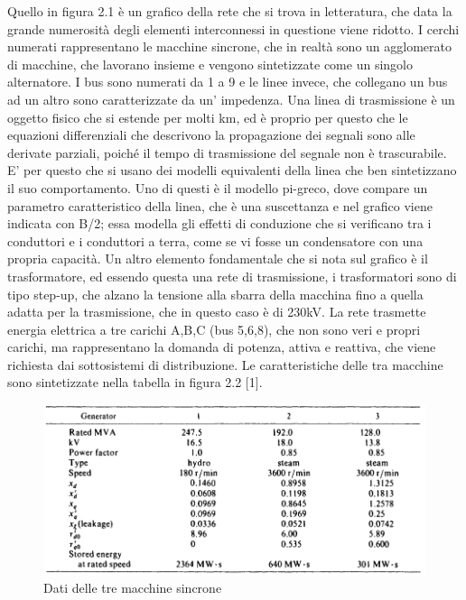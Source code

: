 \documentclass[Lau,noexaminfo]{sapthesis}
\begin{document}
	Quello in figura 2.1 è un grafico della rete che si trova in letteratura, che data la grande numerosità degli elementi interconnessi in questione viene ridotto. I cerchi numerati rappresentano le macchine sincrone, che in realtà sono un agglomerato di macchine, che lavorano insieme e vengono sintetizzate come un singolo alternatore. I bus sono numerati da 1 a 9 e le linee invece, che collegano un bus ad un altro sono caratterizzate da un' impedenza. Una linea di trasmissione è un oggetto fisico che si estende per molti km, ed è proprio per questo che le equazioni differenziali che descrivono la propagazione dei segnali sono alle derivate parziali, poiché il tempo di trasmissione del segnale non è trascurabile. E' per questo che si usano dei modelli equivalenti della linea che ben sintetizzano il suo comportamento. Uno di questi è il modello pi-greco, dove compare un parametro caratteristico della linea, che è una suscettanza e nel grafico viene indicata con B/2; essa modella gli effetti di conduzione che si verificano tra i conduttori e i conduttori a terra, come se vi fosse un condensatore con una propria capacità. Un altro elemento fondamentale che si nota sul grafico è il trasformatore, ed essendo questa una rete di trasmissione, i trasformatori sono di tipo step-up, che alzano la tensione alla sbarra della macchina fino a quella adatta per la trasmissione, che in questo caso è di 230kV. La rete trasmette energia elettrica a tre carichi A,B,C (bus 5,6,8), che non sono veri e propri carichi, ma rappresentano la domanda di potenza, attiva e reattiva, che viene richiesta dai sottosistemi di distribuzione. Le caratteristiche delle tra macchine sono sintetizzate nella tabella in figura 2.2 [1].
	\begin{figure}
		\includegraphics[height=0.3\textheight]{macchineWSCC}
		\caption{Dati delle tre macchine sincrone}
	\end{figure}
\end{document}
